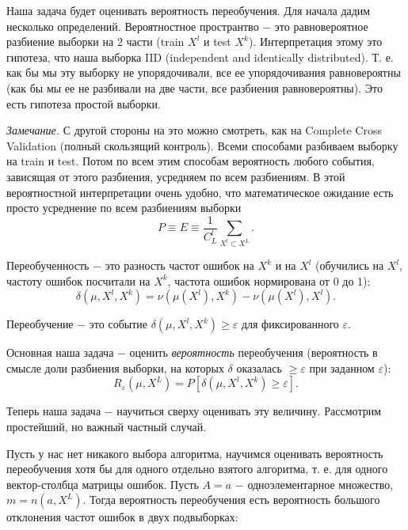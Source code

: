 Наша задача будет оценивать вероятность переобучения. Для начала дадим несколько определений.
Вероятностное пространтво $-$ это равновероятное разбиение выборки на 2 части (train $X^l$ и test $X^k$). Интерпретация этому это гипотеза, что наша выборка IID (independent and identically distributed). Т. е. как бы мы эту выборку не упорядочивали, все ее упорядочивания равновероятны (как бы мы ее не разбивали на две части, все разбиения равновероятны). Это есть гипотеза простой выборки.

\textit{Замечание.} С другой стороны на это можно смотреть, как на Complete Cross Validation (полный скользящий контроль). Всеми способами разбиваем выборку на train и test. Потом по всем этим способам вероятность любого события, зависящая от этого разбиения, усредняем по всем разбиениям. В этой вероятностной интерпретации очень удобно, что математическое ожидание есть просто усреднение по всем разбиениям выборки
\begin{equation*}
    P \equiv E \equiv \frac{1}{C_L^l} \sum_{X^l \subset X^L}.
\end{equation*}

Переобученность $-$ это разность частот ошибок на $X^k$ и на $X^l$ (обучились на $X^l$, частоту ошибок посчитали на $X^k$, частота ошибок нормирована от 0 до 1):
\begin{equation*}
    \delta (\mu, X^l, X^k)=\nu (\mu(X^l), X^k ) - \nu(\mu(X^l), X^l ).
\end{equation*}

Переобучение $-$ это событие $\delta (\mu, X^l, X^k) \geq \varepsilon$ для фиксированного $\varepsilon$.

Основная наша задача $-$ оценить \textit{вероятность} переобучения (вероятность в смысле доли разбиения выборки, на которых $\delta$ оказалась $\geq \varepsilon$ при заданном $\varepsilon$):
\begin{equation*}
    R_{\varepsilon}(\mu, X^L) = P [\delta(\mu, X^l, X^k) \geq \varepsilon].
\end{equation*}

Теперь наша задача $-$ научиться сверху оценивать эту величину. Рассмотрим простейший, но важный частный случай.

Пусть у нас нет никакого выбора алгоритма, научимся оценивать вероятность переобучения хотя бы для одного отдельно взятого алгоритма, т. е. для одного вектор-столбца матрицы ошибок.
Пусть $A = {a}$ $-$ одноэлементарное множество, $m=n(a, X^L)$. Тогда вероятность переобучения есть вероятность большого отклонения частот ошибок в двух подвыборках:

